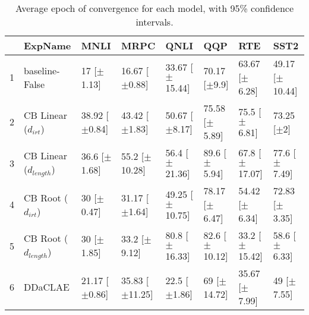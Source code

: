 \begin{table*}[ht]
\centering
\begingroup\small
\begin{tabular}{rlllllll}
  \hline
 & ExpName & MNLI & MRPC & QNLI & QQP & RTE & SST2 \\ 
  \hline
1 & baseline-False & 17 [$\pm$1.13] & 16.67 [$\pm$0.88] & 33.67 [$\pm$15.44] & 70.17 [$\pm$9.9] & 63.67 [$\pm$6.28] & 49.17 [$\pm$10.44] \\ 
  2 & CB Linear ($d_{irt}$) & 38.92 [$\pm$0.84] & 43.42 [$\pm$1.83] & 50.67 [$\pm$8.17] & 75.58 [$\pm$5.89] & 75.5 [$\pm$6.81] & 73.25 [$\pm$2] \\ 
  3 & CB Linear ($d_{length}$) & 36.6 [$\pm$1.68] & 55.2 [$\pm$10.28] & 56.4 [$\pm$21.36] & 89.6 [$\pm$5.94] & 67.8 [$\pm$17.07] & 77.6 [$\pm$7.49] \\ 
  4 & CB Root ($d_{irt}$) & 30 [$\pm$0.47] & 31.17 [$\pm$1.64] & 49.25 [$\pm$10.75] & 78.17 [$\pm$6.47] & 54.42 [$\pm$6.34] & 72.83 [$\pm$3.35] \\ 
  5 & CB Root ($d_{length}$) & 30 [$\pm$1.85] & 33.2 [$\pm$9.12] & 80.8 [$\pm$16.33] & 82.6 [$\pm$10.12] & 33.2 [$\pm$15.42] & 58.6 [$\pm$6.33] \\ 
  6 & DDaCLAE & 21.17 [$\pm$0.86] & 35.83 [$\pm$11.25] & 22.5 [$\pm$1.86] & 69 [$\pm$14.72] & 35.67 [$\pm$7.99] & 49 [$\pm$7.55] \\ 
   \hline
\end{tabular}
\endgroup
\caption{Average epoch of convergence for each model, with 95\% confidence intervals.} 
\label{tab:epoch_lstm-False}
\end{table*}
